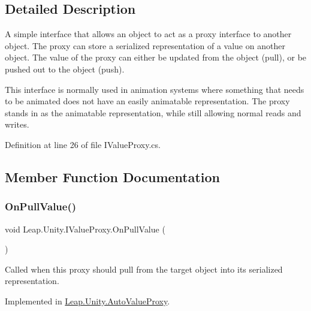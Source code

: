 \subsection{Detailed Description}
A simple interface that allows an object to act as a \textquotesingle{}proxy\textquotesingle{} interface to another object. The proxy can store a serialized representation of a value on another object. The value of the proxy can either be updated from the object (pull), or be pushed out to the object (push). 

This interface is normally used in animation systems where something that needs to be animated does not have an easily animatable representation. The proxy stands in as the animatable representation, while still allowing normal reads and writes. 

Definition at line 26 of file I\+Value\+Proxy.\+cs.



\subsection{Member Function Documentation}
\mbox{\label{interface_leap_1_1_unity_1_1_i_value_proxy_a7f9d6fc629e00aa51cca2a3c39c8b097}} 
\subsubsection{\texorpdfstring{OnPullValue()}{OnPullValue()}}
{\footnotesize\ttfamily void Leap.\+Unity.\+I\+Value\+Proxy.\+On\+Pull\+Value (\begin{DoxyParamCaption}{ }\end{DoxyParamCaption})}



Called when this proxy should pull from the target object into its serialized representation. 



Implemented in \mbox{\hyperlink{class_leap_1_1_unity_1_1_auto_value_proxy_a2d62ff32cd2a3ca3caaeb5debd19cecf}{Leap.\+Unity.\+Auto\+Value\+Proxy}}.

\mbox{\label{interface_leap_1_1_unity_1_1_i_value_proxy_ae15d0179600a616ef6bdc8e1a9e2566c}} 
